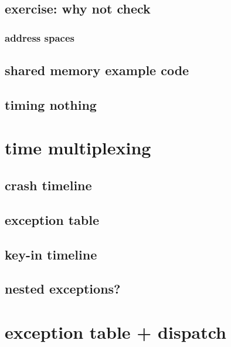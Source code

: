 
\subsection{exercise: why not check}


\subsubsection{address spaces}


\subsection{shared memory example code}


\subsection{timing nothing}


\section{time multiplexing}


\subsection{crash timeline}


\subsection{exception table}


\subsection{key-in timeline}


\subsection{nested exceptions?}


\section{exception table + dispatch}


